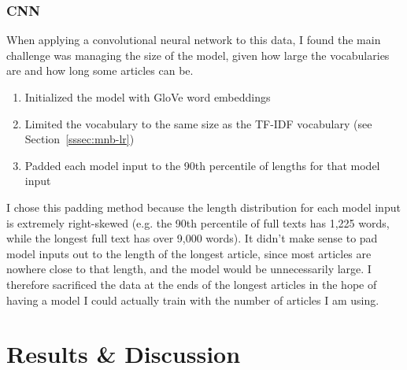 \documentclass[11pt,a4paper,table]{article}
\begin{document}
\subsubsection{CNN}
\label{sssec:cnn}

When applying a convolutional neural network to this data, I found the main challenge was managing the size of the model, given how large the vocabularies are and how long some articles can be. 

\begin{enumerate}
\item Initialized the model with GloVe word embeddings \cite{GloVe}
\item Limited the vocabulary to the same size as the TF-IDF vocabulary (see Section~\ref{sssec:mnb-lr})
\item Padded each model input to the 90th percentile of lengths for that model input
\end{enumerate}

I chose this padding method because the length distribution for each model input is extremely right-skewed (e.g. the 90th percentile of full texts has 1,225 words, while the longest full text has over 9,000 words). It didn't make sense to pad model inputs out to the length of the longest article, since most articles are nowhere close to that length, and the model would be unnecessarily large. I therefore sacrificed the data at the ends of the longest articles in the hope of having a model I could actually train with the number of articles I am using.

\begin{table}
\centering
{}
\caption{CNN Vocabulary and Padding Sizes}
\label{tbl:cnn}
\end{table}

\section{Results \& Discussion}
\label{sec:results}
\end{document}
